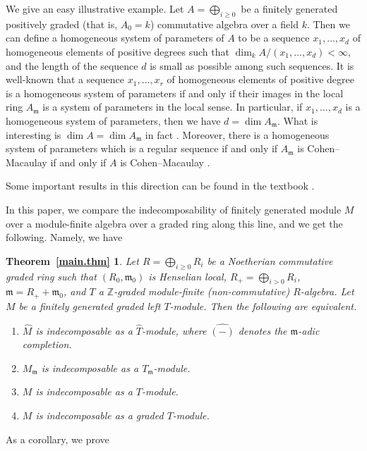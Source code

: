 \documentclass[11pt,leqno]{article}
\newtheorem*{Theorem}{Theorem~\ref{main.thm}}
\theoremstyle{definition}
\theoremstyle{remark}
\theoremstyle{remark}
\def\({{\rm (}}
\def\){{\rm )}}
\let\Bbb\mathbb
\newcommand{\fm}{\ensuremath{\mathfrak m}}
\def\({{\rm(}}
\def\){{\rm)}}
\def\fm{\mathfrak{m}}
\begin{document}
We give an easy illustrative example.
Let $A=\bigoplus_{i\geq 0}$ be a finitely generated positively graded (that is, $A_0=k$) commutative algebra over a field $k$.
Then we can define a homogeneous system of parameters of $A$ to be a sequence $x_1,\ldots,x_d$ of
homogeneous elements of positive degrees such that $\dim_k A/(x_1,\ldots,x_d)<\infty$, and
the length of the sequence $d$ is small as possible among such sequences.
It is well-known that a sequence $x_1,\ldots,x_r$ of homogeneous elements of positive degree is a homogeneous system of
parameters if and only if their images in the local ring $A_\fm$ is a system of parameters in the local sense.
In particular, if $x_1,\ldots,x_d$ is a homogeneous system of parameters, then we have $d=\dim A_\fm$.
What is interesting is $\dim A=\dim A_\fm$ in fact \cite[Section~1.5]{BH}.
Moreover, there is a homogeneous system of parameters which is a regular sequence if and only if
$A_\fm$ is Cohen--Macaulay if and only if $A$ is Cohen--Macaulay \cite{MR}.

Some important results in this direction can be found in the textbook \cite{BH}.

In this paper, we compare the indecomposability of finitely generated module $M$ over a module-finite
algebra over a graded ring along this line, and we get the following.
Namely, we have

\begin{Theorem}
  Let $R=\bigoplus_{i\geq 0}R_i$ be a Noetherian commutative graded ring such that $(R_0,\fm_0)$ is Henselian local,
  $R_+=\bigoplus_{i>0}R_i$, $\fm=R_++\fm_0$, and $T$ a $\Bbb Z$-graded module-finite \(non-commutative\) $R$-algebra.
  Let $M$ be a finitely generated graded left $T$-module.
  Then the following are equivalent.
  \begin{enumerate}
  \item[\rm(1)] $\hat M$ is indecomposable as a $\hat T$-module, where $\widehat{(-)}$ denotes
    the $\fm$-adic completion.
  \item[\rm(2)] $M_\fm$ is indecomposable as a $T_\fm$-module.
  \item[\rm(3)] $M$ is indecomposable as a $T$-module.
  \item[\rm(4)] $M$ is indecomposable as a graded $T$-module.
  \end{enumerate}
\end{Theorem}

As a corollary, we prove
\end{document}
